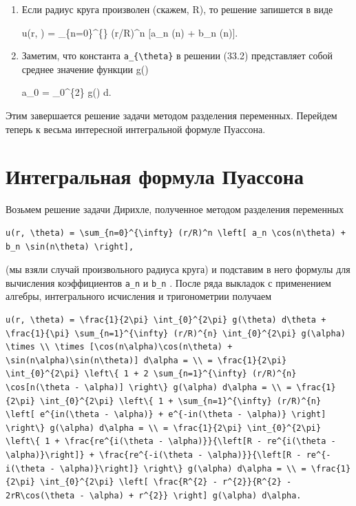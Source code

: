 \documentclass[
  ukrainian,
]{article}
\begin{document}
\begin{enumerate}
\def\labelenumi{\arabic{enumi}.}
\setcounter{enumi}{2}
\item
  Если радиус круга произволен (скажем, R), то решение запишется в виде

  u(r, \theta) = \sum\_\{n=0\}\^{}\{\infty\} (r/R)\^{}n {[}a\_n
  \cos(n\theta) + b\_n \sin(n\theta){]}.
\item
  Заметим, что константа \texttt{a\_\{\textbackslash{}theta\}} в решении
  (33.2) представляет собой среднее значение функции
  g\left(\theta\right)

  a\_0 =  \int\_0\^{}\{2\pi\} g(\theta) d\theta.
\end{enumerate}

Этим завершается решение задачи методом разделения переменных. Перейдем
теперь к весьма интересной интегральной формуле Пуассона.

\section{Интегральная формула
Пуассона}\label{ux438ux43dux442ux435ux433ux440ux430ux43bux44cux43dux430ux44f-ux444ux43eux440ux43cux443ux43bux430-ux43fux443ux430ux441ux441ux43eux43dux430}

Возьмем решение задачи Дирихле, полученное методом разделения переменных

\begin{verbatim}
u(r, \theta) = \sum_{n=0}^{\infty} (r/R)^n \left[ a_n \cos(n\theta) + b_n \sin(n\theta) \right],
\end{verbatim}

(мы взяли случай произвольного радиуса круга) и подставим в него формулы
для вычисления коэффициентов \texttt{a\_n} и \texttt{b\_n} . После ряда
выкладок с применением алгебры, интегрального исчисления и тригонометрии
получаем

\begin{verbatim}
u(r, \theta) = \frac{1}{2\pi} \int_{0}^{2\pi} g(\theta) d\theta + \frac{1}{\pi} \sum_{n=1}^{\infty} (r/R)^{n} \int_{0}^{2\pi} g(\alpha) \times \\ \times [\cos(n\alpha)\cos(n\theta) + \sin(n\alpha)\sin(n\theta)] d\alpha = \\ = \frac{1}{2\pi} \int_{0}^{2\pi} \left\{ 1 + 2 \sum_{n=1}^{\infty} (r/R)^{n} \cos[n(\theta - \alpha)] \right\} g(\alpha) d\alpha = \\ = \frac{1}{2\pi} \int_{0}^{2\pi} \left\{ 1 + \sum_{n=1}^{\infty} (r/R)^{n} \left[ e^{in(\theta - \alpha)} + e^{-in(\theta - \alpha)} \right] \right\} g(\alpha) d\alpha = \\ = \frac{1}{2\pi} \int_{0}^{2\pi} \left\{ 1 + \frac{re^{i(\theta - \alpha)}}{\left[R - re^{i(\theta - \alpha)}\right]} + \frac{re^{-i(\theta - \alpha)}}{\left[R - re^{-i(\theta - \alpha)}\right]} \right\} g(\alpha) d\alpha = \\ = \frac{1}{2\pi} \int_{0}^{2\pi} \left[ \frac{R^{2} - r^{2}}{R^{2} - 2rR\cos(\theta - \alpha) + r^{2}} \right] g(\alpha) d\alpha.
\end{verbatim}
\end{document}
